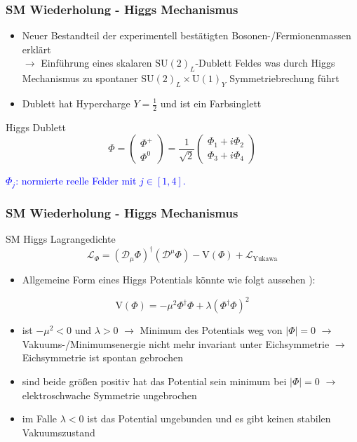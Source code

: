 \documentclass[xcolor=dvipsnames]{beamer}
\begin{document}
\begin{frame}
\frametitle{SM Wiederholung - Higgs Mechanismus }
\begin{itemize}
\item Neuer Bestandteil der experimentell bestätigten Bosonen-/Fermionenmassen erklärt \\ $\rightarrow$ Einführung eines skalaren $\text{SU}(2)_{L}$-Dublett Feldes was durch Higgs Mechanismus zu spontaner $\text{SU}(2)_{L}\times\text{U}(1)_{Y}$ Symmetriebrechung führt
\item Dublett hat Hypercharge $Y=\frac{1}{2}$ und ist ein Farbsinglett 
\end{itemize}

\begin{block}{Higgs Dublett}
\begin{equation*}
\Phi=\left( \begin{array}{c} \Phi^{+}\\ \Phi^{0} \end{array}\right)= \frac{1}{\sqrt{2}}\left( \begin{array}{c} \Phi_{1}+i\Phi_{2}\\ \Phi_{3}+i\Phi_{4} \end{array}\right)
\end{equation*}
\end{block}
\textcolor{Blue}{$\Phi_{j}$:  normierte reelle  Felder mit  $j \in [1,4] $. \autocite{4}}
\end{frame}

\begin{frame}
\frametitle{SM Wiederholung - Higgs Mechanismus }

\begin{block}{SM Higgs Lagrangedichte}
\begin{equation*}
\mathscr{L}_{\Phi}=(\mathscr{D}_{\mu}\Phi)^{\dagger}(\mathscr{D}^{\mu}\Phi) - \text{V}(\Phi) + \mathscr{L}_{\text{Yukawa}}
\end{equation*}
\end{block}
\begin{itemize}
\item  Allgemeine Form eines Higgs Potentials könnte wie folgt aussehen \autocite{4}):
\end{itemize}
\begin{equation*}
 \text{V}(\Phi)=-\mu^{2} \Phi^{\dagger}\Phi +\lambda ( \Phi^{\dagger}\Phi)^{2}
\end{equation*}

\begin{itemize}
\item ist $-\mu^{2}<0$ und $\lambda>0$  $\rightarrow$ Minimum des Potentials weg von $|\Phi|=0$ $\rightarrow$ Vakuums-/Minimumsenergie nicht mehr invariant unter Eichsymmetrie $\rightarrow$ Eichsymmetrie ist spontan gebrochen
\item sind beide größen positiv hat das Potential sein minimum bei  $|\Phi|=0$ $ \rightarrow$ elektroschwache Symmetrie ungebrochen
\item im Falle $\lambda<0$ ist das Potential ungebunden und es gibt keinen stabilen Vakuumszustand
\end{itemize}
\end{frame}
\end{document}
